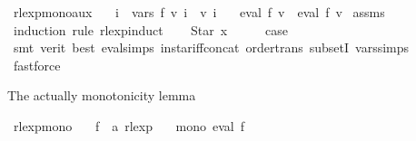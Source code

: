 \begin{isabellebody}
{}
\isamarkuptrue%
%
\endisatagdocument
{\isafolddocument}%
%
\isadelimdocument
%
\endisadelimdocument
{}\isamarkupfalse%
\ rlexp{\isacharunderscore}{\kern0pt}mono{\isacharunderscore}{\kern0pt}aux{\isacharcolon}{\kern0pt}\isanewline
\ \ \ {\isachardoublequoteopen}{\isasymforall}i\ {\isasymin}\ vars\ f{\isachardot}{\kern0pt}\ v\ i\ {\isasymsubseteq}\ v{\isacharprime}{\kern0pt}\ i{\isachardoublequoteclose}\isanewline
\ \ \ {\isachardoublequoteopen}eval\ f\ v\ {\isasymsubseteq}\ eval\ f\ v{\isacharprime}{\kern0pt}{\isachardoublequoteclose}\isanewline
%
\isadelimproof
%
\endisadelimproof
%
\isatagproof
{}\isamarkupfalse%
\ assms\ \isamarkupfalse%
\ {\isacharparenleft}{\kern0pt}induction\ rule{\isacharcolon}{\kern0pt}\ rlexp{\isachardot}{\kern0pt}induct{\isacharparenright}{\kern0pt}\isanewline
\ \ \isamarkupfalse%
\ {\isacharparenleft}{\kern0pt}Star\ x{\isacharparenright}{\kern0pt}\isanewline
\ \ \isamarkupfalse%
\ \isamarkupfalse%
\ {\isacharquery}{\kern0pt}case\isanewline
\ \ \ \ \isamarkupfalse%
\ {\isacharparenleft}{\kern0pt}smt\ {\isacharparenleft}{\kern0pt}verit{\isacharcomma}{\kern0pt}\ best{\isacharparenright}{\kern0pt}\ eval{\isachardot}{\kern0pt}simps{\isacharparenleft}{\kern0pt}{}{\isacharparenright}{\kern0pt}\ in{\isacharunderscore}{\kern0pt}star{\isacharunderscore}{\kern0pt}iff{\isacharunderscore}{\kern0pt}concat\ order{\isacharunderscore}{\kern0pt}trans\ subsetI\ vars{\isachardot}{\kern0pt}simps{\isacharparenleft}{\kern0pt}{}{\isacharparenright}{\kern0pt}{\isacharparenright}{\kern0pt}\isanewline
{}\isamarkupfalse%
\ fastforce{\isacharplus}{\kern0pt}%
\endisatagproof
{\isafoldproof}%
%
\isadelimproof
%
\endisadelimproof
%
\begin{isamarkuptext}%
The actually monotonicity lemma%
\end{isamarkuptext}\isamarkuptrue%
\isamarkupfalse%
\ rlexp{\isacharunderscore}{\kern0pt}mono{\isacharcolon}{\kern0pt}\isanewline
\ \ \ f\ {\isacharcolon}{\kern0pt}{\isacharcolon}{\kern0pt}\ {\isachardoublequoteopen}{\isacharprime}{\kern0pt}a\ rlexp{\isachardoublequoteclose}\isanewline
\ \ \ {\isachardoublequoteopen}mono\ {\isacharparenleft}{\kern0pt}eval\ f{\isacharparenright}{\kern0pt}{\isachardoublequoteclose}\isanewline
%
\isadelimproof
\ \ %
\endisadelimproof
%
\isatagproof
{}\isamarkupfalse%

\end{isabellebody}
